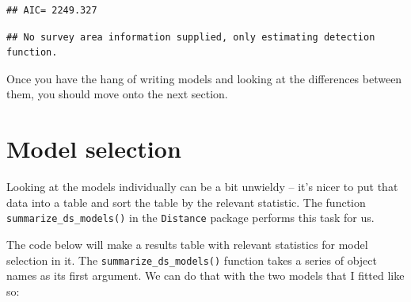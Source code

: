 \documentclass[]{book}
\newenvironment{Shaded}{\begin{snugshade}}{\end{snugshade}}
\newcommand{\KeywordTok}[1]{\textcolor[rgb]{0.13,0.29,0.53}{\textbf{#1}}}
\newcommand{\DataTypeTok}[1]{\textcolor[rgb]{0.13,0.29,0.53}{#1}}
\newcommand{\DecValTok}[1]{\textcolor[rgb]{0.00,0.00,0.81}{#1}}
\newcommand{\StringTok}[1]{\textcolor[rgb]{0.31,0.60,0.02}{#1}}
\newcommand{\OtherTok}[1]{\textcolor[rgb]{0.56,0.35,0.01}{#1}}
\newcommand{\OperatorTok}[1]{\textcolor[rgb]{0.81,0.36,0.00}{\textbf{#1}}}
\newcommand{\NormalTok}[1]{#1}
\theoremstyle{definition}
\theoremstyle{definition}
\theoremstyle{remark}
\begin{document}
\begin{verbatim}
## AIC= 2249.327
\end{verbatim}

\begin{verbatim}
## No survey area information supplied, only estimating detection function.
\end{verbatim}

Once you have the hang of writing models and looking at the differences
between them, you should move onto the next section.

\section{Model selection}\label{model-selection}

Looking at the models individually can be a bit unwieldy -- it's nicer
to put that data into a table and sort the table by the relevant
statistic. The function \texttt{summarize\_ds\_models()} in the
\texttt{Distance} package performs this task for us.

The code below will make a results table with relevant statistics for
model selection in it. The \texttt{summarize\_ds\_models()} function
takes a series of object names as its first argument. We can do that
with the two models that I fitted like so:

\begin{Shaded}
\end{Shaded}

\begin{table}

\caption{\label{tab:df-results}Comparison of half normal and hazard rate with sea state and group size.}
\centering
{}
\end{table}
\end{document}

